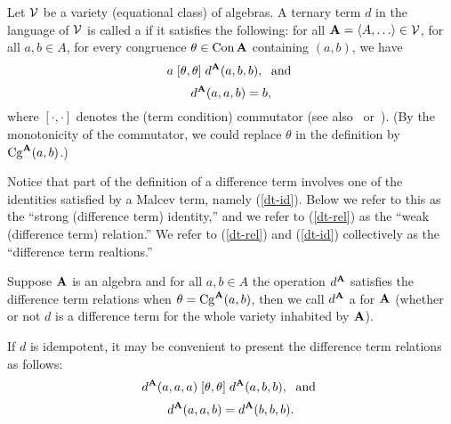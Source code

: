 Let $\mathcal{V}$ be a variety (equational class) of algebras.
A ternary term $d$ in the language of $\mathcal{V}$ is called 
a  if it satisfies the following:
for all $\bA = \<A, \dots \> \in \sV$, for all $a, b \in A$, for every 
congruence $\theta\in \operatorname{Con}\mathbf{A}$ containing $(a,b)$, we have
\begin{equation}
  \label{dt-rel}
  a \mathrel{[\theta, \theta]} d^{\mathbf{A}}(a,b,b), \; \text{ and }
\end{equation}
\begin{equation}
  \label{dt-id}
d^{\mathbf{A}}(a,a,b) = b, 
\end{equation}
where %
$[\cdot, \cdot]$ denotes the (term condition) commutator
(see also~\cite{HM:1988} or~\cite{MR3076179}).
(By the monotonicity of the commutator, we could replace $\theta$ in the
definition by $\operatorname{Cg}^{\mathbf{A}}(a,b)$.)

Notice that part of
the definition of a difference term involves one of
the identities satisfied by a Malcev term, namely
(\ref{dt-id}). Below we refer to this as the ``strong (difference term) identity,''
and we refer to (\ref{dt-rel}) as the ``weak (difference term) relation.''
We refer to (\ref{dt-rel}) and (\ref{dt-id}) collectively as the ``difference term
realtions.''

Suppose $\mathbf{A}$ is an algebra and for all $a,b \in A$
the operation $d^{\mathbf{A}}$ satisfies the difference term relations when
$\theta = \operatorname{Cg}^{\mathbf{A}}(a,b)$, then we call $d^{\mathbf{A}}$
a  for $\mathbf{A}$
(whether or not $d$ is a difference
term for the whole variety inhabited by $\mathbf{A}$).

If $d$ is idempotent, it may be convenient to present the difference term
relations as follows:
\begin{equation}
  \label{dt-rel-idemp}
  d^{\mathbf{A}}(a,a,a) \mathrel{[\theta, \theta]} d^{\mathbf{A}}(a,b,b), \; \text{ and }
\end{equation}
\begin{equation}
  \label{dt-id-idemp}
d^{\mathbf{A}}(a,a,b) =   d^{\mathbf{A}}(b,b,b).
\end{equation}

